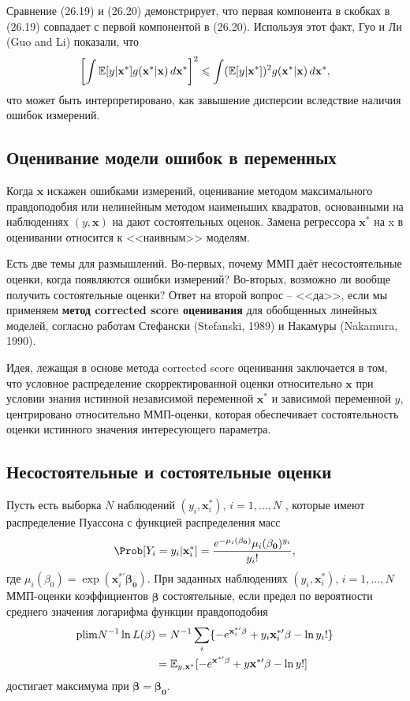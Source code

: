 Сравнение (26.19) и (26.20) демонстрирует, что первая компонента в скобках в (26.19) совпадает с первой компонентой в (26.20). Используя этот факт, Гуо и Ли (Guo and Li) показали, что
\begin{equation}
 \left[ \int \mathbb{E}[y| \mathbf{x^*}]g(\mathbf{x^*|x})\, d\mathbf{x^*} \right]^2 \leqslant \int (\mathbb{E}[y| \mathbf{x^*}])^2 g(\mathbf{x^*|x})\, d\mathbf{x^*},
\end{equation}
что может быть интерпретировано, как завышение дисперсии вследствие наличия ошибок измерений.

\subsection*{Оценивание модели ошибок в переменных} 
Когда $\mathbf{x}$ искажен ошибками измерений, оценивание методом максимального правдоподобия или нелинейным методом наименьших квадратов, основанными на наблюдениях $(y, \mathbf{x})$ на дают состоятельных оценок. Замена  регрессора $\mathbf{x^*}$ на x в оценивании относится к <<наивным>> моделям.

Есть две темы для размышлений. Во-первых, почему ММП даёт несостоятельные оценки, когда появляются ошибки измерений? Во-вторых, возможно ли вообще получить состоятельные оценки? Ответ на второй вопрос – <<да>>, если мы применяем {\bf метод corrected score оценивания} для обобщенных линейных моделей, согласно работам Стефански (Stefanski, 1989) и Накамуры (Nakamura, 1990). 

Идея, лежащая в основе метода corrected score оценивания заключается в том, что условное распределение скорректированной оценки относительно $\mathbf{x}$ при условии знания истинной независимой переменной $\mathbf{x^*}$ и зависимой переменной $y$, центрировано относительно ММП-оценки, которая обеспечивает состоятельность оценки истинного значения интересующего параметра.

\subsection*{Несостоятельные и состоятельные оценки} 
Пусть есть выборка $N$ наблюдений $(y_i, \mathbf{x}^*_i), \, i=1, \dots,N$ , которые имеют распределение Пуассона с функцией распределения масс
\[
\Prob[Y_i=y_i|\mathbf{x}^*_i]=\frac{e^{-\mu_i(\mathbf{\beta_0})}\mu_i(\mathbf{\beta_0})^{y_i}}{y_i!},
\]
где $\mu_i(\beta_0)=\exp(\mathbf{x}^{*\prime}_i \mathbf{\beta_0})$. При заданных наблюдениях $(y_i, \mathbf{x}^*_i), \, i=1, \dots,N$ ММП-оценки коэффициентов $\mathbf{\widehat{\beta}}$ состоятельные, если предел по вероятности среднего значения логарифма функции правдоподобия
\begin{align}
\mathrm{plim } N^{-1}\ln L(\mathbf{\beta})&=N^{-1} \sum \limits_i \{ -e^{\mathbf{x}^{*\prime}_i \mathbf{\beta}} + y_i \mathbf{x}^{*\prime}_i \mathbf{\beta} - \ln y_i! \} \notag \\
&= \mathbb{E}_{y,\mathbf{x^*}}[-e^{\mathbf{x^{*\prime}} \mathbf{\beta}} + y \mathbf{x^{*\prime}} \mathbf{\beta} - \ln y! ]
\end{align}
достигает максимума при $\mathbf{\beta} = \mathbf{\beta_0}$.

